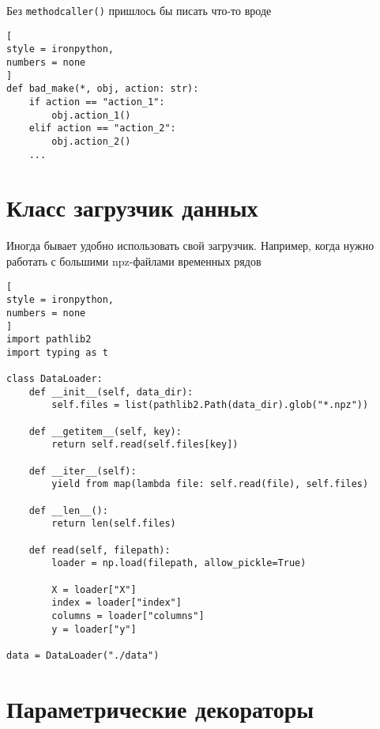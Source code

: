 \documentclass[%
	11pt,
	a4paper,
	utf8,
		]{article}
\begin{document}
Без \texttt{methodcaller()} пришлось бы писать что-то вроде
\begin{lstlisting}[
style = ironpython,
numbers = none
]
def bad_make(*, obj, action: str):
    if action == "action_1":
        obj.action_1()
    elif action == "action_2":
        obj.action_2()
    ...
\end{lstlisting}

\section{Класс загрузчик данных}

Иногда бывает удобно использовать свой загрузчик. Например, когда нужно работать с большими npz-файлами временных рядов
\begin{lstlisting}[
style = ironpython,
numbers = none
]
import pathlib2
import typing as t

class DataLoader:
    def __init__(self, data_dir):
        self.files = list(pathlib2.Path(data_dir).glob("*.npz"))
        
    def __getitem__(self, key):
        return self.read(self.files[key])
        
    def __iter__(self):
        yield from map(lambda file: self.read(file), self.files)
        
    def __len__():
        return len(self.files)
        
    def read(self, filepath):
        loader = np.load(filepath, allow_pickle=True)
        
        X = loader["X"]
        index = loader["index"]
        columns = loader["columns"]
        y = loader["y"]
        
data = DataLoader("./data")
\end{lstlisting}

\section{Параметрические декораторы}
\end{document}
